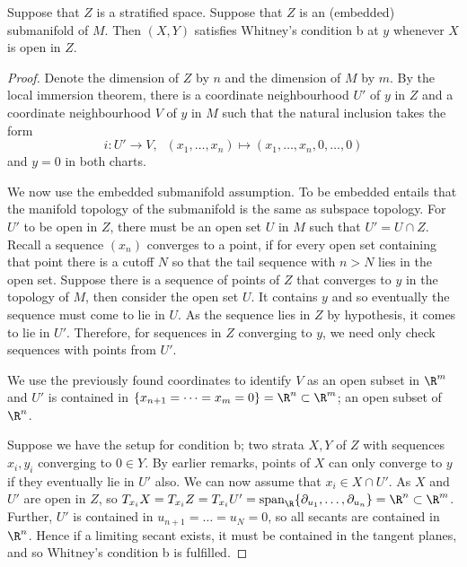 \begin{lem}
    \label{lem:cond_b_pair}
Suppose that $Z$ is a stratified space. Suppose that $Z$ is an (embedded) submanifold of $M$. Then $(X,Y)$ satisfies Whitney's condition b at $y$ whenever $X$ is open in $Z$.
\begin{proof}
Denote the dimension of $Z$ by $n$ and the dimension of $M$ by $m$. By the local immersion theorem, there is a coordinate neighbourhood $U'$ of $y$ in $Z$ and a coordinate neighbourhood $V$ of $y$ in $M$ such that the natural inclusion takes the form
\[
i : U' \to V, \;\; (x_1, \dots, x_n) \mapsto (x_1, \dots, x_n, 0, \dots, 0)
\]
and $y=0$ in both charts.

We now use the embedded submanifold assumption. To be embedded entails that the manifold topology of the submanifold is the same as subspace topology. For $U'$ to be open in $Z$, there must be an open set $U$ in $M$ such that $U' = U \cap Z$. Recall a sequence $(x_n)$ converges to a point, if for every open set containing that point there is a cutoff $N$ so that the tail sequence with $n>N$ lies in the open set. Suppose there is a sequence of points of $Z$ that converges to $y$ in the topology of $M$, then consider the open set $U$. It contains $y$ and so eventually the sequence must come to lie in $U$. As the sequence lies in $Z$ by hypothesis, it comes to lie in $U'$. Therefore, for sequences in $Z$ converging to $y$, we need only check sequences with points from $U'$.

We use the previously found coordinates to identify $V$ as an open subset in $\R^m$ and $U'$ is contained in $\{x_{n+1}=\dots = x_{m} = 0\} = \R^n \subset \R^m$; an open subset of $\R^n$.

Suppose we have the setup for condition b; two strata $X,Y$ of $Z$ with sequences $x_i, y_i$ converging to $0\in Y$. By earlier remarks, points of $X$ can only converge to $y$ if they eventually lie in $U'$ also. We can now assume that $x_i \in X\cap U'$. As $X$ and $U'$ are open in $Z$, so $T_{x_i} X = T_{x_i} Z = T_{x_i} U' = \text{span}_\R \{ \partial_{u_1}, \dots, \partial_{u_n} \} = \R^n \subset \R^m$. Further, $U'$ is contained in $u_{n+1}=\dots = u_{N} = 0$, so all secants are contained in $\R^n$. Hence if a limiting secant exists, it must be contained in the tangent planes, and so Whitney's condition b is fulfilled.

\end{proof}
\end{lem}


